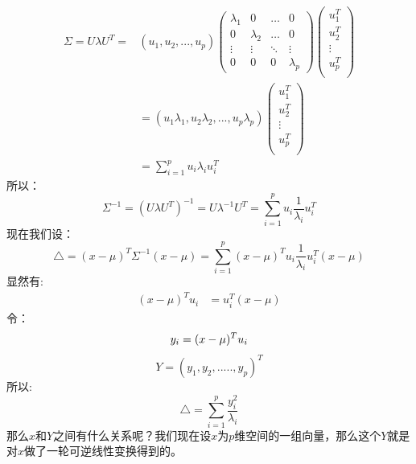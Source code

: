 \documentclass[withoutpreface,bwprint]{cumcmthesis} %
\begin{document}
	\begin{align*}
		\Sigma =U{\lambda}U^T=&\left(u_1,u_2,...,u_p\right) \left( 
			\begin{array}{cccc}
				\lambda_1 & 0 & \ldots & 0\\
				0 & \lambda_2 &  \ldots & 0\\
				\vdots  & \vdots  &  \ddots & \vdots \\
				0 & 0 & 0 & \lambda_p
			\end{array}
		\right)\left( 
			\begin{array}{c}
				u_1^T\\
				u_2^T\\
				\vdots\\
				u_p^T\\
			\end{array}
		\right)\\
		&=\left( u_1\lambda_1,u_2\lambda_2,...,u_p\lambda_p\right) \left( 
		\begin{array}{c}
			u_1^T\\
			u_2^T\\
			\vdots\\
			u_p^T\\
		\end{array}
		\right)\\
		&=\sum_{i=1}^{p} u_i \lambda_i u_i^T
	\end{align*}
	所以：
	\begin{equation}
		\Sigma ^{-1}=(U{\lambda}U^T)^{-1}=U{\lambda}^{-1}U^T=\sum_{i=1}^{p} u_i \dfrac{1}{\lambda_i} u_i^T
	\end{equation}
	现在我们设：
	\begin{equation}
		\bigtriangleup=(x-\mu)^T\Sigma^{-1}(x-\mu)=\sum_{i=1}^{p}(x-\mu)^T u_i \dfrac{1}{\lambda_i}u_i^T(x-\mu)
	\end{equation}
	显然有:
	\begin{align*}
		(x-\mu)^T u_i&=u_i^T(x-\mu)
	\end{align*}
	令：
	\begin{equation}
		y_i=(x-\mu)^T u_i\\
	\end{equation}
	\begin{equation}
		Y=(y_1,y_2,.....,y_p)^T
	\end{equation}
	所以:
	\begin{equation}
		\bigtriangleup=\sum_{i=1}^{p} \dfrac{y_i^2}{\lambda_i}
	\end{equation}
	\newpage
	那么$x$和$Y$之间有什么关系呢？我们现在设$x$为$p$维空间的一组向量，那么这个$Y$就是对$x$做了一轮可逆线性变换得到的。
\end{document}
